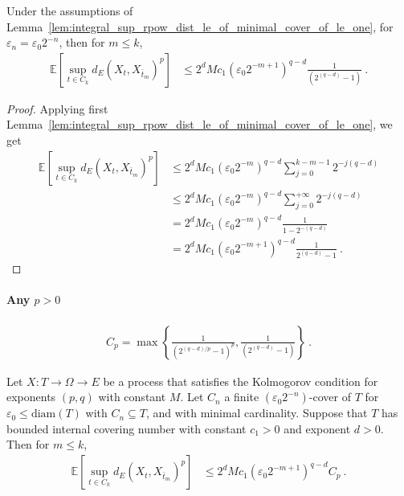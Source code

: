 \begin{corollary}\label{cor:integral_sup_rpow_dist_le_of_minimal_cover_two_of_le_one}
  \leanok
Under the assumptions of Lemma~\ref{lem:integral_sup_rpow_dist_le_of_minimal_cover_of_le_one}, for $\varepsilon_n = \varepsilon_0 2^{-n}$, then for $m \le k$,
\begin{align*}
  \mathbb{E} \left[\sup_{t \in C_k} d_E(X_t, X_{\bar{t}_m})^p \right]
  &\le 2^d M c_1 (\varepsilon_0 2^{-m + 1})^{q - d} \frac{1}{\left( 2^{(q -d)} - 1\right)}
  \: .
\end{align*}
\end{corollary}

\begin{proof}\leanok
Applying first Lemma~\ref{lem:integral_sup_rpow_dist_le_of_minimal_cover_of_le_one}, we get
\begin{align*}
  \mathbb{E} \left[\sup_{t \in C_k} d_E(X_t, X_{\bar{t}_m})^p \right]
  &\le 2^d M c_1 (\varepsilon_0 2^{-m})^{q-d}\sum_{j=0}^{k-m-1} 2^{- j (q - d)}
  \\
  &\le 2^d M c_1 (\varepsilon_0 2^{-m})^{q-d}\sum_{j=0}^{+\infty} 2^{- j (q - d)}
  \\
  &= 2^d M c_1 (\varepsilon_0 2^{-m})^{q-d} \frac{1}{1 - 2^{-(q - d)}}
  \\
  &= 2^d M c_1 (\varepsilon_0 2^{-m+1})^{q-d} \frac{1}{2^{(q - d)} - 1}
  \: .
\end{align*}
\end{proof}


\paragraph{Any $p>0$}


\begin{definition}\label{def:Cp}
  \leanok
\begin{align*}
  C_p = \max\left\{\frac{1}{\left( 2^{(q -d)/p} - 1\right)^p}, \frac{1}{\left( 2^{(q -d)} - 1\right)} \right\}
  \: .
\end{align*}
\end{definition}


\begin{lemma}\label{lem:second_term_bound}
  \leanok
Let $X : T \to \Omega \to E$ be a process that satisfies the Kolmogorov condition for exponents $(p,q)$ with constant $M$.
Let $C_n$ a finite $(\varepsilon_0 2^{-n})$-cover of $T$ for $\varepsilon_0 \le \mathrm{diam}(T)$ with $C_n \subseteq T$, and with minimal cardinality.
Suppose that $T$ has bounded internal covering number with constant $c_1>0$ and exponent $d > 0$.
Then for $m \le k$,
\begin{align*}
  \mathbb{E} \left[\sup_{t \in C_k} d_E(X_t, X_{\bar{t}_m})^p \right]
  &\le 2^d M c_1 (\varepsilon_0 2^{-m + 1})^{q - d} C_p
  \: .
\end{align*}
\end{lemma}

